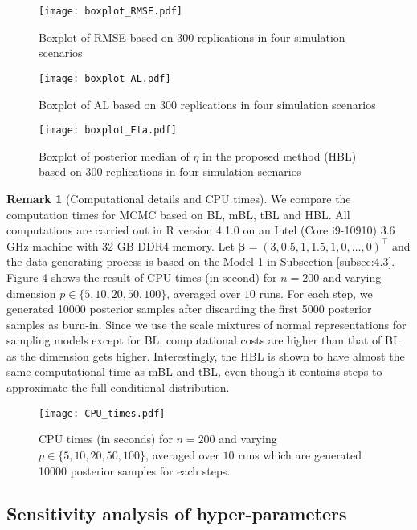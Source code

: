 \documentclass[11pt]{article}
\theoremstyle{plain}
\theoremstyle{definition}
\newtheorem{rem}{Remark}[section]
\begin{document}
\begin{figure}[htpb]
\centering
\texttt{[image: boxplot\_RMSE.pdf]}
\caption{Boxplot of RMSE based on 300 replications in four simulation scenarios}
\label{fig:RMSE}
\end{figure}

\begin{figure}[htpb]
\centering
\texttt{[image: boxplot\_AL.pdf]}
\caption{Boxplot of AL based on 300 replications in four simulation scenarios}
\label{fig:AL}
\end{figure}

\begin{figure}[htpb]
\centering
\texttt{[image: boxplot\_Eta.pdf]}
\caption{Boxplot of posterior median of $\eta$ in the proposed method (HBL) based on 300 replications in four simulation scenarios}
\label{fig:eta}
\end{figure}

\begin{rem}[Computational details and CPU times]
We compare the computation times for MCMC based on BL, mBL, tBL and HBL. All computations are carried out in R version 4.1.0 on an Intel (Core i9-10910) 3.6 GHz machine with 32 GB DDR4 memory. Let $\bm{\beta}=(3,0.5,1,1.5,1,0,\dots,0)^{\top}$ and the data generating process is based on the Model 1 in Subsection \ref{subsec:4.3}. Figure \ref{fig:CPU} shows the result of CPU times (in second) for $n = 200$ and varying dimension $p \in \{5,10,20,50,100\}$, averaged over $10$ runs. For each step, we generated 10000 posterior samples after discarding the first 5000 posterior samples as burn-in. Since we use the scale mixtures of normal representations for sampling models except for BL, computational costs are higher than that of BL as the dimension gets higher. Interestingly, the HBL is shown to have almost the same computational time as mBL and tBL, even though it contains steps to approximate the full conditional distribution.
\end{rem}




\begin{figure}[htpb]
\centering
\texttt{[image: CPU\_times.pdf]}
\caption{CPU times (in seconds) for $n = 200$ and varying $p\in \{5,10,20,50,100\}$, averaged over $10$ runs which are generated 10000 posterior samples for each steps.}
\label{fig:CPU}
\end{figure}


\subsection{Sensitivity analysis of hyper-parameters}
\label{subsec:4.4}
\end{document}
